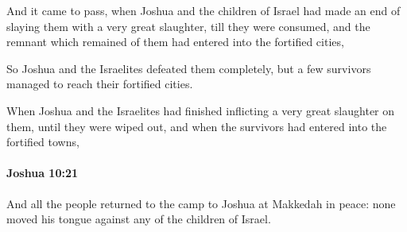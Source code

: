 			\begin{versebox}
					\item[BHS] 
					\item[ASV] And it came to pass, when Joshua and the children of Israel had made an end of slaying them with a very great slaughter, till they were consumed, and the remnant which remained of them had entered into the fortified cities,
					\item[NIV] So Joshua and the Israelites defeated them completely, but a few survivors managed to reach their fortified cities.
					\item[NRSV] When Joshua and the Israelites had finished inflicting a very great slaughter on them, until they were wiped out, and when the survivors had entered into the fortified towns,
			\end{versebox}

		\paragraph{Joshua 10:21} %
			\label{JOSHUA-10-21}

			And all the people returned to the camp to Joshua at Makkedah in peace: none moved his tongue against any of the children of Israel.

